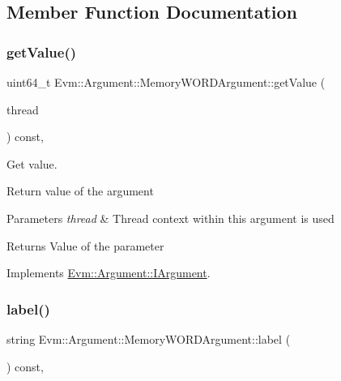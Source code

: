 \subsection{Member Function Documentation}
\mbox{\label{struct_evm_1_1_argument_1_1_memory_w_o_r_d_argument_a689f534d26558b10f9d10ae80e221dee}} 
\subsubsection{\texorpdfstring{get\+Value()}{getValue()}}
{\footnotesize\ttfamily uint64\+\_\+t Evm\+::\+Argument\+::\+Memory\+W\+O\+R\+D\+Argument\+::get\+Value (\begin{DoxyParamCaption}\item[{\mbox{\hyperlink{struct_evm_1_1_thread_context}{Thread\+Context}} \&}]{thread }\end{DoxyParamCaption}) const\hspace{0.3cm}{\ttfamily [override]}, {\ttfamily [virtual]}}



Get value. 

Return value of the argument 
\begin{DoxyParams}{Parameters}
{\em thread} & Thread context within this argument is used \\
\hline
\end{DoxyParams}
\begin{DoxyReturn}{Returns}
Value of the parameter 
\end{DoxyReturn}


Implements \mbox{\hyperlink{struct_evm_1_1_argument_1_1_i_argument_af01db10f34498344831877847c2fc038}{Evm\+::\+Argument\+::\+I\+Argument}}.

\mbox{\label{struct_evm_1_1_argument_1_1_memory_w_o_r_d_argument_a3a719074885eb9d1329e75a2b888bd47}} 
\subsubsection{\texorpdfstring{label()}{label()}}
{\footnotesize\ttfamily string Evm\+::\+Argument\+::\+Memory\+W\+O\+R\+D\+Argument\+::label (\begin{DoxyParamCaption}{ }\end{DoxyParamCaption}) const\hspace{0.3cm}{\ttfamily [override]}, {\ttfamily [virtual]}}



